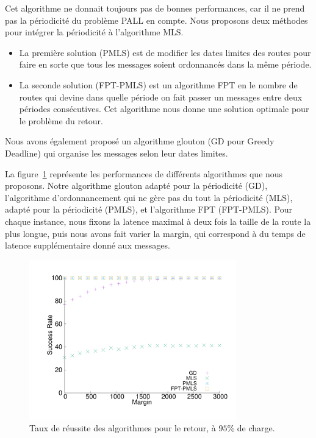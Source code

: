\documentclass{article}
\begin{document}
Cet algorithme ne donnait toujours pas de bonnes performances, car il ne prend pas la périodicité du problème PALL en compte. Nous proposons deux méthodes pour intégrer la périodicité à l'algorithme MLS.
\begin{itemize}
\item La première solution (PMLS) est de modifier les dates limites des routes pour faire en sorte que tous les messages soient ordonnancés dans la même période.
\item La seconde solution (FPT-PMLS) est un algorithme FPT en le nombre de routes qui devine dans quelle période on fait passer un messages entre deux périodes consécutives. Cet algorithme nous donne une solution optimale pour le problème du retour.
\end{itemize}
Nous avons également proposé un algorithme glouton (GD pour Greedy Deadline) qui organise les messages selon leur dates limites. 

La figure~\ref{fig:success21000} représente les performances de différents algorithmes que nous proposons. Notre algorithme glouton adapté pour la périodicité (GD), l'algorithme d'ordonnancement qui ne gère pas du tout la périodicité (MLS), adapté pour la périodicité (PMLS), et l'algorithme FPT (FPT-PMLS).
Pour chaque instance, nous fixons la latence maximal à deux fois la taille de la route la plus longue, puis nous avons fait varier la margin, qui correspond à du temps de latence supplémentaire donné aux messages.

    \begin{figure} [h] 
       \begin{center}
      \includegraphics[width=0.8\textwidth]{retour_21000.pdf}
      \end{center}
      \caption{Taux de réussite des algorithmes pour le retour, à $95\%$ de charge.}
     \label{fig:success21000}
     \end{figure}
    
\end{document}
